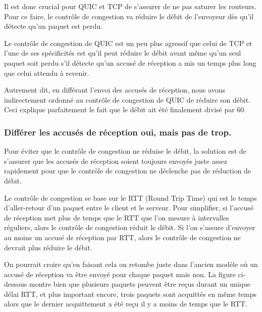 Il est donc crucial pour QUIC et TCP de s'assurer de ne pas saturer les routeurs. Pour ce faire, le contrôle de congestion va réduire le débit de l'envoyeur dès qu'il détecte qu'un paquet est perdu.

\vspace{0.5cm}

Le contrôle de congestion de QUIC est un peu plus agressif que celui de TCP et l'une de ses spécificités est qu'il peut réduire le débit avant même qu'un seul paquet soit perdu s'il détecte qu'un accusé de réception a mis un temps plus long que celui attendu à revenir.

Autrement dit, en différant l'envoi des accusés de réception, nous avons indirectement ordonné au contrôle de congestion de QUIC de réduire son débit.
Ceci explique parfaitement le fait que le débit ait été finalement divisé par 60.

\subsubsection{Différer les accusés de réception oui, mais pas de trop.}

Pour éviter que le contrôle de congestion ne réduise le débit, la solution est de s'assurer que les accusés de réception soient toujours envoyés juste assez rapidement pour que le contrôle de congestion ne déclenche pas de réduction de débit.

Le contrôle de congestion se base sur le RTT (Round Trip Time) qui est le temps d'aller-retour d'un paquet entre le client et le serveur. Pour simplifier, si l'accusé de réception met plus de temps que le RTT que l'on mesure à intervalles réguliers, alors le contrôle de congestion réduit le débit.
Si l'on s'assure d'envoyer au moins un accusé de réception par RTT, alors le contrôle de congestion ne devrait plus réduire le débit.

On pourrait croire qu'en faisant cela on retombe juste dans l'ancien modèle où un accusé de réception va être envoyé pour chaque paquet mais non.
La figure ci-dessous montre bien que plusieurs paquets peuvent être reçus durant un unique délai RTT, et plus important encore, trois paquets sont acquittés en même temps alors que le dernier acquittement a été reçu il y a moins de temps que le RTT.

